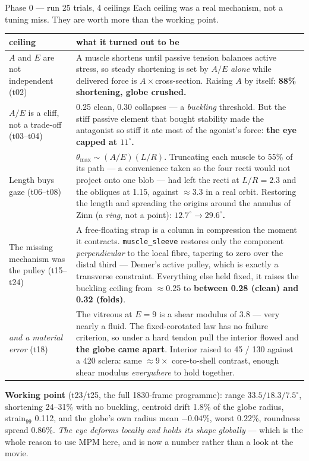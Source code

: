 \documentclass[11pt,a4paper]{article}
\newcommand{\code}[1]{\texttt{#1}}
\begin{document}
\begin{runbox}{Phase 0 --- run \hfill 25 trials, 4 ceilings}
Each ceiling was a real mechanism, not a tuning miss. They are worth more than the working point.

\footnotesize
\begin{tabular}{@{}p{3.0cm} p{11.0cm}@{}}
\toprule
\textbf{ceiling} & \textbf{what it turned out to be}\\
\midrule
$A$ and $E$ are not independent (t02) & A muscle shortens until passive tension balances active
stress, so steady shortening is set by $A/E$ \emph{alone} while delivered force is
$A\times$cross-section. Raising $A$ by itself: \textbf{88\% shortening, globe crushed.}\\
$A/E$ is a cliff, not a trade-off (t03--t04) & 0.25 clean, 0.30 collapses --- a \emph{buckling}
threshold. But the stiff passive element that bought stability made the antagonist so stiff it ate
most of the agonist's force: \textbf{the eye capped at $11^\circ$.}\\
Length buys gaze (t06--t08) & $\theta_{\max}\!\sim\!(A/E)(L/R)$. Truncating each muscle to 55\% of
its path --- a convenience taken so the four recti would not project onto one blob --- had left the
recti at $L/R=2.3$ and the obliques at 1.15, against $\approx3.3$ in a real orbit. Restoring the
length and spreading the origins around the annulus of Zinn (a \emph{ring}, not a point):
\textbf{$12.7^\circ \to 29.6^\circ$.}\\
The missing mechanism was the pulley (t15--t24) & A free-floating strap is a column in compression
the moment it contracts. \code{muscle\_sleeve} restores only the component \emph{perpendicular} to
the local fibre, tapering to zero over the distal third --- Demer's active pulley, which is exactly
a transverse constraint. Everything else held fixed, it raises the buckling ceiling from
$\approx$0.25 to \textbf{between 0.28 (clean) and 0.32 (folds)}.\\
\midrule
\emph{and a material error} (t18) & The vitreous at $E=9$ is a shear modulus of 3.8 --- very nearly
a fluid. The fixed-corotated law has no failure criterion, so under a hard tendon pull the interior
flowed and \textbf{the globe came apart}. Interior raised to 45 / 130 against a 420 sclera: same
$\approx9\times$ core-to-shell contrast, enough shear modulus \emph{everywhere} to hold together.\\
\bottomrule
\end{tabular}
\normalsize

\textbf{Working point} (t23/t25, the full 1830-frame programme): range $33.5/18.3/7.5^\circ$,
shortening 24--31\% with no buckling, centroid drift 1.8\% of the globe radius,
strain$_{99}$ 0.112, and the globe's own radius mean $-0.04\%$, worst $0.22\%$, roundness spread
$0.86\%$. \emph{The eye deforms locally and holds its shape globally} --- which is the whole reason
to use MPM here, and is now a number rather than a look at the movie.


\end{runbox}
\end{document}
